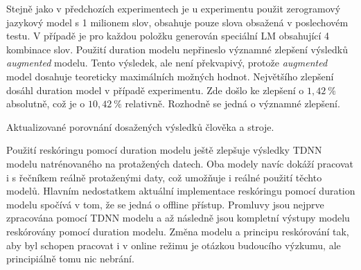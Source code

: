 Stejně jako v předchozích experimentech je u  experimentu použit zerogramový jazykový model s 1 milionem slov,  obsahuje pouze slova obsažená v poslechovém testu. V případě  je pro každou položku generován speciální LM obsahující 4 kombinace slov. Použití duration modelu nepřineslo významné zlepšení výsledků \textit{augmented} modelu. Tento výsledek, ale není překvapivý, protože \textit{augmented} model dosahuje teoreticky maximálních možných hodnot. Největšího zlepšení dosáhl duration model v případě  experimentu. Zde došlo ke zlepšení o $1,42\ \%$ absolutně, což je o $10,42\ \%$ relativně. Rozhodně se jedná o významné zlepšení.

\begin{table}[htpb]
  \centering
  \def\arraystretch{1.5}
  \caption{Aktualizované porovnání dosažených výsledků člověka a stroje.}
  \label{tab:realisation:duration:comparison}
\end{table}

Použití reskóringu pomocí duration modelu ještě zlepšuje výsledky TDNN modelu natrénovaného na protažených datech. Oba modely navíc dokáží pracovat i s řečníkem reálně protaženými daty, což umožňuje i reálné použití těchto modelů. Hlavním nedostatkem aktuální implementace reskóringu pomocí duration modelu spočívá v tom, že se jedná o offline přístup. Promluvy jsou nejprve zpracována pomocí TDNN modelu a až následně jsou kompletní výstupy modelu reskórovány pomocí duration modelu. Změna modelu a principu reskórování tak, aby byl schopen pracovat i v online režimu je otázkou budoucího výzkumu, ale principiálně tomu nic nebrání.
